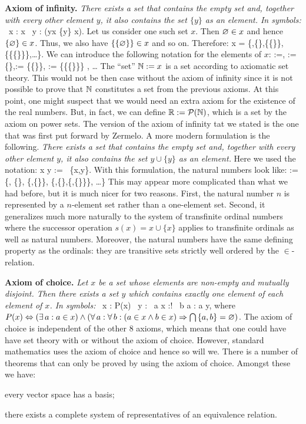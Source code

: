\textbf{Axiom of infinity.} \emph{There exists a set that contains the empty set and,  together with every other element $y$, it also contains the set $\{y\}$ as an element. In symbols:}
\bse
\exists \, x : \vn \in x \land \forall \, y : (y\in x \imp \{y\} \in x).
\ese
Let us consider one such set $x$. Then $\varnothing \in x$ and hence $\{\varnothing\}\in x$. Thus, we also have $\{\{\varnothing\}\}\in x$ and so on. Therefore:
\bse
x = \{\vn,\{\vn\},\{\{\vn\}\},\{\{\{\vn\}\}\},\ldots\}.
\ese
We can introduce the following notation for the elements of $x$:
 :=\vn ,   := \{\vn\},:= \{\{\vn\}\}, := \{\{\{\vn\}\}\} , \quad \ldots
\ese
\bc
The ``set'' $\mathbb{N}:=x$ is a set according to axiomatic set theory.
\ec
This would not be then case without the axiom of infinity since it is not possible to prove that $\mathbb{N}$ constitutes a set from the previous axioms.
\br
At this point, one might suspect that we would need an extra axiom for the existence of the real numbers. But, in fact, we can define $\mathbb{R} := \mathcal{P}(\mathbb{N})$, which is a set by the axiom on power sets.
\er
\br
The version of the axiom of infinity tat we stated is the one that was first put forward by Zermelo. A more modern formulation is the following. \emph{There exists a set that contains the empty set and, together with every other element $y$, it also contains the set $y\cup\{y\}$ as an element.} Here we used the notation:
\bse
x \cup y := \bigcup \, \{x,y\}.
\ese
With this formulation, the natural numbers look like:
\bse
\N := \{\vn, \{\vn\}, \{\vn,\{\vn\}\}, \{\vn,\{\vn\},\{\vn,\{\vn\}\}\}, \ldots \}
\ese
This may appear more complicated than what we had before, but it is much nicer for two reasons.  First, the natural number $n$ is represented by a $n$-element set rather than a one-element set. Second, it generalizes much more naturally to the system of transfinite ordinal numbers where the successor operation $s(x)=x\cup\{x\}$ applies to transfinite ordinals as well as natural numbers. Moreover, the natural numbers have the same defining property as the ordinals: they are transitive sets strictly well ordered by the $\in$-relation.
\er

\textbf{Axiom of choice.} \emph{Let $x$ be a set whose elements are non-empty and mutually disjoint. Then there exists a set $y$ which contains exactly one element of each element of $x$. In symbols:}
\bse
\forall \, x : P(x) \imp \exists \, y : \forall \, a \in x :\exists! \, b \in a : a \in y,
\ese
where $P(x) \Leftrightarrow (\exists \,a : a \in x) \land (\forall \, a : \forall \, b : (a\in x \land b \in x) \Rightarrow \bigcap \, \{a,b\} = \varnothing )$.
\br
The axiom of choice is independent of the other 8 axioms, which means that one could have have set theory with or without the axiom of choice. However, standard mathematics uses the axiom of choice and hence so will we. There is a number of theorems that can only be proved by using the axiom of choice. Amongst these we have:
\bit
\item every vector space has a basis;
\item there exists a complete system of representatives of an equivalence relation.
\eit
\er

